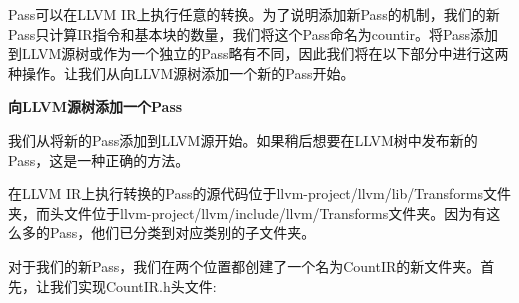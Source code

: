 
Pass可以在LLVM IR上执行任意的转换。为了说明添加新Pass的机制，我们的新Pass只计算IR指令和基本块的数量，我们将这个Pass命名为countir。将Pass添加到LLVM源树或作为一个独立的Pass略有不同，因此我们将在以下部分中进行这两种操作。让我们从向LLVM源树添加一个新的Pass开始。\par

\hspace*{\fill} \par %
\textbf{向LLVM源树添加一个Pass}

我们从将新的Pass添加到LLVM源开始。如果稍后想要在LLVM树中发布新的Pass，这是一种正确的方法。\par

在LLVM IR上执行转换的Pass的源代码位于llvm-project/llvm/lib/Transforms文件夹，而头文件位于llvm-project/llvm/include/llvm/Transforms文件夹。因为有这么多的Pass，他们已分类到对应类别的子文件夹。\par

对于我们的新Pass，我们在两个位置都创建了一个名为CountIR的新文件夹。首先，让我们实现CountIR.h头文件:\par

